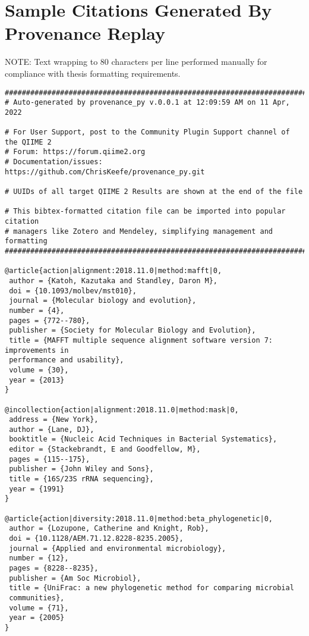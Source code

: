 \chapter{Sample Citations Generated By Provenance Replay}
\label{app:citationsOutput}

\noindent NOTE: Text wrapping to 80 characters per line performed manually for
compliance with thesis formatting requirements.

\begin{footnotesize}
\begin{verbatim}
###############################################################################
# Auto-generated by provenance_py v.0.0.1 at 12:09:59 AM on 11 Apr, 2022

# For User Support, post to the Community Plugin Support channel of the QIIME 2
# Forum: https://forum.qiime2.org
# Documentation/issues: https://github.com/ChrisKeefe/provenance_py.git

# UUIDs of all target QIIME 2 Results are shown at the end of the file

# This bibtex-formatted citation file can be imported into popular citation
# managers like Zotero and Mendeley, simplifying management and formatting
###############################################################################

@article{action|alignment:2018.11.0|method:mafft|0,
 author = {Katoh, Kazutaka and Standley, Daron M},
 doi = {10.1093/molbev/mst010},
 journal = {Molecular biology and evolution},
 number = {4},
 pages = {772--780},
 publisher = {Society for Molecular Biology and Evolution},
 title = {MAFFT multiple sequence alignment software version 7: improvements in
 performance and usability},
 volume = {30},
 year = {2013}
}

@incollection{action|alignment:2018.11.0|method:mask|0,
 address = {New York},
 author = {Lane, DJ},
 booktitle = {Nucleic Acid Techniques in Bacterial Systematics},
 editor = {Stackebrandt, E and Goodfellow, M},
 pages = {115--175},
 publisher = {John Wiley and Sons},
 title = {16S/23S rRNA sequencing},
 year = {1991}
}

@article{action|diversity:2018.11.0|method:beta_phylogenetic|0,
 author = {Lozupone, Catherine and Knight, Rob},
 doi = {10.1128/AEM.71.12.8228-8235.2005},
 journal = {Applied and environmental microbiology},
 number = {12},
 pages = {8228--8235},
 publisher = {Am Soc Microbiol},
 title = {UniFrac: a new phylogenetic method for comparing microbial
 communities},
 volume = {71},
 year = {2005}
}


\end{verbatim}
\end{footnotesize}
